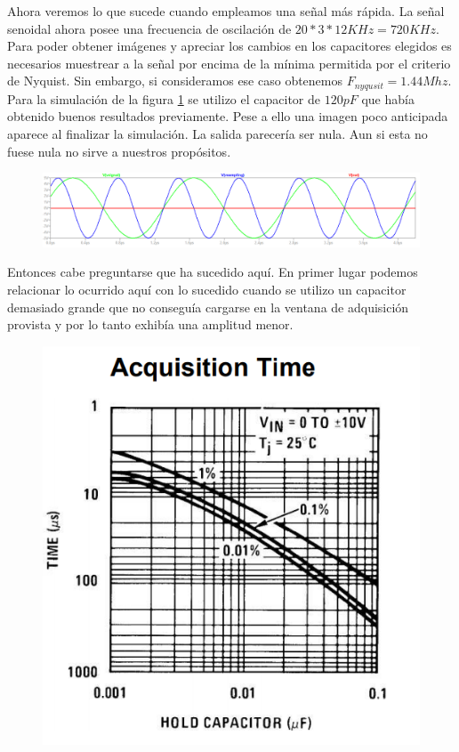 Ahora veremos lo que sucede cuando empleamos una señal más rápida.
La señal senoidal ahora posee una frecuencia de oscilación de $20*3*12 KHz = 720KHz$. Para poder obtener imágenes y apreciar los cambios en los capacitores elegidos es necesarios muestrear a la señal por encima de la mínima permitida por el criterio de Nyquist. Sin embargo, si consideramos ese caso obtenemos  $F_{nyqusit}=1.44Mhz$.
Para la simulación de la  figura \ref{fig:vin21440ksamplign120pf} se utilizo el capacitor de $120pF$ que había obtenido buenos resultados previamente. Pese a ello una imagen poco anticipada aparece al finalizar la simulación. La salida parecería ser nula. Aun si esta no fuese nula no sirve a nuestros propósitos. 
\begin{figure}[H]
	\centering
	\includegraphics[width=\linewidth]{ImagenesEjercicio4/ChTests/Vin2_1440kSamplign120pF}
	\caption{}
	\label{fig:vin21440ksamplign120pf}
\end{figure}

Entonces cabe preguntarse que ha sucedido aquí. 
En primer lugar podemos relacionar lo ocurrido aquí con lo sucedido cuando se utilizo un capacitor demasiado grande que no conseguía cargarse en la ventana de adquisición provista y por lo tanto exhibía una amplitud menor.

\begin{figure}[H]
	\centering
	\includegraphics[scale=0.6]{ImagenesEjercicio4/HoldCapAcqTime}
	\caption{}
	\label{fig:holdcapacqtime}
\end{figure}


